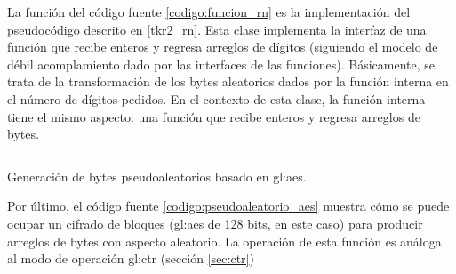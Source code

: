 La función del código fuente \ref{codigo:funcion_rn} es la implementación del
pseudocódigo descrito en \ref{tkr2_rn}. Esta clase implementa la
interfaz de una función que recibe enteros y regresa arreglos de dígitos
(siguiendo el modelo de débil acomplamiento dado por las interfaces de
las funciones). Básicamente, se trata de la transformación de
los bytes aleatorios dados por la función interna en el número de
dígitos pedidos. En el contexto de esta clase, la función interna tiene
el mismo aspecto: una función que recibe enteros y regresa arreglos de bytes.

\begin{listing}
  \inputminted[firstline=51, lastline=82]
    {c++}{../implementaciones/tkr/pseudoaleatorio_aes.cpp}
  \caption{Generación de bytes pseudoaleatorios basado en \acrshort{gl:aes}.}
  \label{codigo:pseudoaleatorio_aes}
\end{listing}

Por último, el código fuente \ref{codigo:pseudoaleatorio_aes} muestra
cómo se puede ocupar un cifrado de bloques (\gls{gl:aes} de 128 bits, en
este caso) para producir arreglos de bytes con aspecto aleatorio. La
operación de esta función es análoga al modo de operación \gls{gl:ctr}
(sección \ref{sec:ctr})
